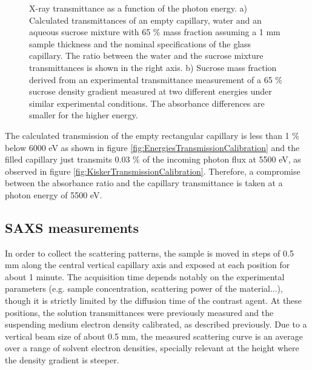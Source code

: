 \begin{figure*}%
	\centering
	\caption[X-ray transmittance of the density gradient capillary at different energies.]{X-ray transmittance as a function of the photon energy. a) Calculated transmittances \citep{henke_x-ray_1993} of an empty capillary, water and an aqueous sucrose mixture with 65 $\%$ mass fraction assuming a 1 mm sample thickness and the nominal specifications of the glass capillary. The ratio between the water and the sucrose mixture transmittances is shown in the right axis. b) Sucrose mass fraction derived from an experimental transmittance measurement of a 65 $\%$ sucrose density gradient measured at two different energies under similar experimental conditions. The absorbance differences are smaller for the higher energy.}

\end{figure*}

The calculated transmission of the empty rectangular capillary is less than 1 $\%$ below 6000 eV as shown in figure \ref{fig:EnergiesTransmissionCalibration} and the filled capillary just transmits 0.03 $\%$ of the incoming photon flux at 5500 eV, as observed in figure \ref{fig:KiskerTransmissionCalibration}. Therefore, a compromise between the absorbance ratio and the capillary transmittance is taken at a photon energy of 5500 eV. 

\subsection{SAXS measurements}
\label{sec:DensityGradientSAXS}

In order to collect the scattering patterns, the sample is moved in steps of 0.5 mm along the central vertical capillary axis and exposed at each position for about 1 minute. The acquisition time depends notably on the experimental parameters (e.g. sample concentration, scattering power of the material...), though it is strictly limited by the diffusion time of the contrast agent. At these positions, the solution transmittances were previously measured and the suspending medium electron density calibrated, as described previously. Due to a vertical beam size of about 0.5 mm, the measured scattering curve is an average over a range of solvent electron densities, specially relevant at the height where the density gradient is steeper. 

